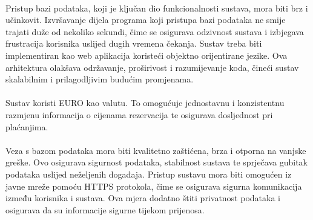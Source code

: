\paragraph*{}{Pristup bazi podataka, koji je ključan dio funkcionalnosti sustava, mora biti brz i učinkovit. Izvršavanje dijela programa koji pristupa bazi podataka ne smije trajati duže od nekoliko sekundi, čime se osigurava odzivnost sustava i izbjegava frustracija korisnika uslijed dugih vremena čekanja. Sustav treba biti implementiran kao web aplikacija koristeći objektno orijentirane jezike. Ova arhitektura olakšava održavanje, proširivost i razumijevanje koda, čineći sustav skalabilnim i prilagodljivim budućim promjenama.}
\paragraph*{}{Sustav koristi EURO kao valutu. To omogućuje jednostavnu i konzistentnu razmjenu informacija o cijenama rezervacija te osigurava dosljednost pri plaćanjima.}
\paragraph*{}{Veza s bazom podataka mora biti kvalitetno zaštićena, brza i otporna na vanjske greške. Ovo osigurava sigurnost podataka, stabilnost sustava te sprječava gubitak podataka uslijed neželjenih događaja. Pristup sustavu mora biti omogućen iz javne mreže pomoću HTTPS protokola, čime se osigurava sigurna komunikacija između korisnika i sustava. Ova mjera dodatno štiti privatnost podataka i osigurava da su informacije sigurne tijekom prijenosa.}

\eject

